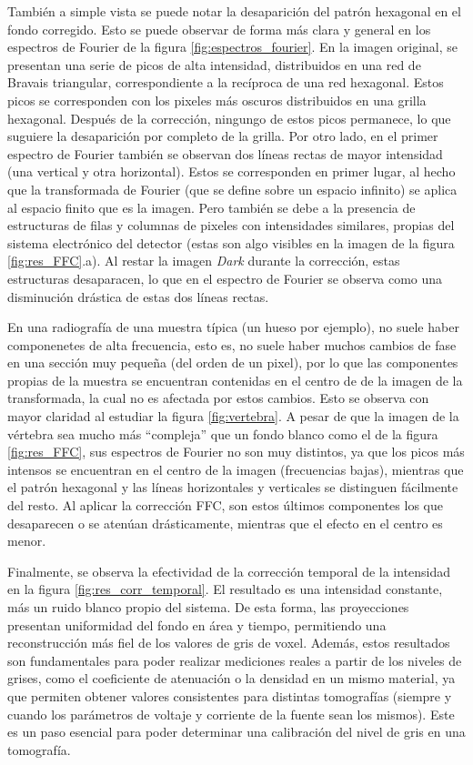 También a simple vista se puede notar la desaparición del patrón hexagonal en el fondo corregido.
Esto se puede observar de forma más clara y general en los espectros de Fourier de la figura
\ref{fig:espectros_fourier}. En la imagen original, se presentan una serie de picos de alta intensidad,
distribuidos en una red de Bravais triangular, correspondiente a la recíproca de una red hexagonal.
Estos picos se corresponden con los pixeles más oscuros distribuidos en una grilla hexagonal. Después
de la corrección, ningungo de estos picos permanece, lo que suguiere la desaparición por completo
de la grilla. Por otro lado, en el primer espectro de Fourier también se observan dos líneas rectas de
mayor intensidad (una vertical y otra horizontal). Estos se corresponden en primer lugar, al hecho
que la transformada de Fourier (que se define sobre un espacio infinito) se aplica al espacio finito
que es la imagen. Pero también se debe a la presencia de estructuras de filas y columnas de pixeles
con intensidades similares, propias del sistema electrónico del detector (estas son algo visibles
en la imagen de la figura \ref{fig:res_FFC}.a). Al restar la imagen \textit{Dark} durante la corrección,
estas estructuras desaparacen, lo que en el espectro de Fourier se observa como una disminución
drástica de estas dos líneas rectas.

En una radiografía de una muestra típica (un hueso por ejemplo), no suele haber componenetes de alta
frecuencia, esto es, no suele haber muchos cambios de fase en una sección muy pequeña (del orden de un
pixel), por lo que las componentes propias de la muestra se encuentran contenidas en el centro de 
de la imagen de la transformada, la cual no es afectada por estos cambios. Esto se observa con
mayor claridad al estudiar la figura \ref{fig:vertebra}. A pesar de que la imagen de la vértebra
sea mucho más ``compleja'' que un fondo blanco como el de la figura \ref{fig:res_FFC}, sus espectros
de Fourier no son muy distintos, ya que los picos más intensos se encuentran en el centro de la imagen
(frecuencias bajas), mientras que el patrón hexagonal y las líneas horizontales y verticales se distinguen
fácilmente del resto. Al aplicar la corrección FFC, son estos últimos componentes los que desaparecen
o se atenúan drásticamente, mientras que el efecto en el centro es menor.

Finalmente, se observa la efectividad de la corrección temporal de la intensidad en la figura
\ref{fig:res_corr_temporal}. El resultado es una intensidad constante, más un ruido blanco
propio del sistema. De esta forma, las proyecciones presentan uniformidad del fondo en área
y tiempo, permitiendo una reconstrucción más fiel de los valores de gris de voxel. Además,
estos resultados son fundamentales para poder realizar mediciones reales a partir de los
niveles de grises, como el coeficiente de atenuación o la densidad en un mismo material, ya
que permiten obtener valores consistentes para distintas tomografías (siempre y cuando los
parámetros de voltaje y corriente de la fuente sean los mismos). Este es un paso esencial
para poder determinar una calibración del nivel de gris en una tomografía.